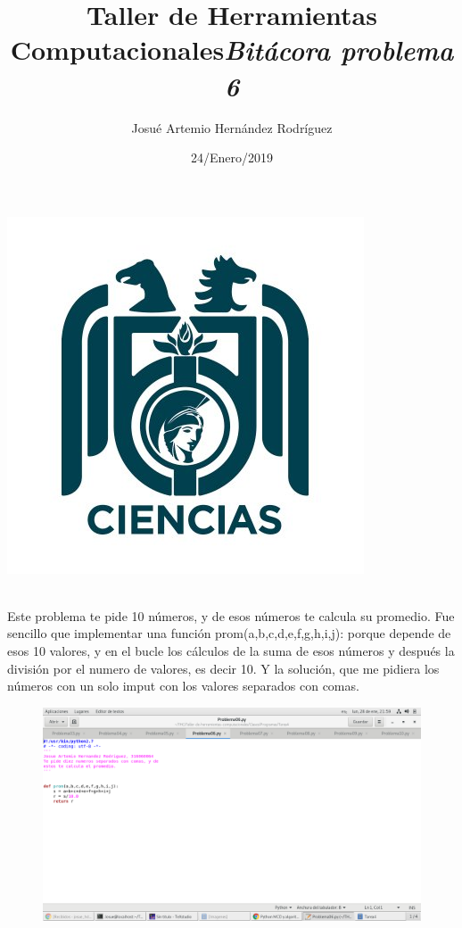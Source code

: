 \label{key}\documentclass[letterpaper, 12pt,oneside]{article}
\title{\Huge Taller de Herramientas Computacionales}
\author{Josué Artemio Hernández Rodríguez}
\date{24/Enero/2019}
\begin{document}
	\maketitle
	\begin{center}
		\includegraphics[scale=0.7]{3.jpg}
	\end{center}

	\newpage
	
	\title{\huge \textit{Bitácora problema 6 }}\\

	Este problema te pide 10 números, y de esos números te calcula su promedio. Fue sencillo que implementar una función prom(a,b,c,d,e,f,g,h,i,j): porque depende de esos 10 valores, y en el bucle los cálculos de la suma de esos números y después la división por el numero de valores, es decir 10. Y la solución, que me pidiera los números con un solo imput con los valores separados con comas. 
	 

	\begin{figure}[h]
		\includegraphics[scale=0.3]{pro06.png}
	\end{figure}
	
	
	
	
	
	
	
	
	
	
	
\end{document}
